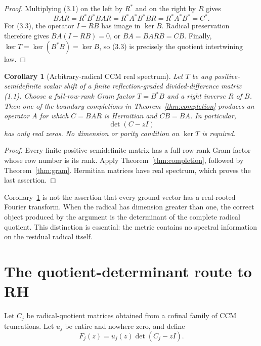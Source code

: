 \documentclass[11pt]{article}
\newtheorem{corollary}[theorem]{Corollary}
\numberwithin{equation}{section}
\theoremstyle{definition}
\theoremstyle{remark}
\newcommand{\kerop}{\operatorname{ker}}
\begin{document}
\begin{proof}
Multiplying (3.1) on the left by $R^*$ and on the right by $R$ gives
\[
 BAR=R^*B^*BAR=R^*A^*B^*BR=R^*A^*B^*=C^*.
\]
For (3.3), the operator $I-RB$ has image in $\kerop B$.  Radical preservation therefore gives
$BA(I-RB)=0$, or $BA=BARB=CB$.  Finally,
$\kerop T=\kerop(B^*B)=\kerop B$, so (3.3) is precisely the quotient intertwining law.
\end{proof}

\begin{corollary}[Arbitrary-radical CCM real spectrum]
\label{cor:ccm}
Let $T$ be any positive-semidefinite scalar shift of a finite reflection-graded
divided-difference matrix (1.1).  Choose a full-row-rank Gram factor $T=B^*B$ and a right inverse
$R$ of $B$.  Then one of the boundary completions in Theorem~\ref{thm:completion} produces an
operator $A$ for which $C=BAR$ is Hermitian and $CB=BA$.  In particular,
\begin{equation}
                         \det(C-zI)
\end{equation}
has only real zeros.  No dimension or parity condition on $\kerop T$ is required.
\end{corollary}

\begin{proof}
Every finite positive-semidefinite matrix has a full-row-rank Gram factor whose row number is its
rank.  Apply Theorem~\ref{thm:completion}, followed by Theorem~\ref{thm:gram}.  Hermitian matrices
have real spectrum, which proves the last assertion.
\end{proof}

Corollary~\ref{cor:ccm} is not the assertion that every ground vector has a real-rooted Fourier
transform.  When the radical has dimension greater than one, the correct object produced by the
argument is the determinant of the complete radical quotient.  This distinction is essential:
the metric contains no spectral information on the residual radical itself.

\section{The quotient-determinant route to RH}

Let $C_j$ be radical-quotient matrices obtained from a cofinal family of CCM truncations.  Let
$u_j$ be entire and nowhere zero, and define
\begin{equation}
                       F_j(z)=u_j(z)\det(C_j-zI).
\end{equation}
\end{document}
